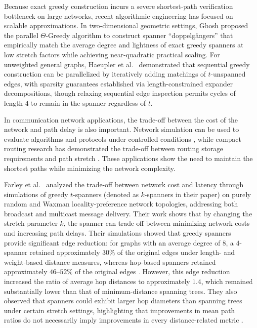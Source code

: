 \documentclass[conference]{IEEEtran}
\begin{document}
Because exact greedy construction incurs a severe shortest-path verification bottleneck on large networks, recent algorithmic engineering has focused on scalable approximations. In two-dimensional geometric settings, Ghosh \cite{ref22} proposed the parallel $\Theta$-Greedy algorithm to construct spanner ``doppelg\"{a}ngers'' that empirically match the average degree and lightness of exact greedy spanners at low stretch factors while achieving near-quadratic practical scaling. For unweighted general graphs, Haeupler et al.\ \cite{ref23} demonstrated that sequential greedy construction can be parallelized by iteratively adding matchings of $t$-unspanned edges, with sparsity guarantees established via length-constrained expander decompositions, though relaxing sequential edge inspection permits cycles of length $4$ to remain in the spanner regardless of $t$.

In communication network applications, the trade-off between the cost of the network and path delay is also important. Network simulation can be used to evaluate algorithms and protocols under controlled conditions \cite{ref24}, while compact routing research has demonstrated the trade-off between routing storage requirements and path stretch \cite{ref25}. These applications show the need to maintain the shortest paths while minimizing the network complexity.

Farley et al.\ \cite{ref16} analyzed the trade-off between network cost and latency through simulations of greedy $t$-spanners (denoted as $k$-spanners in their paper) on purely random and Waxman locality-preference network topologies, addressing both broadcast and multicast message delivery. Their work shows that by changing the stretch parameter $k$, the spanner can trade off between minimizing network costs and increasing path delays. Their simulations showed that greedy spanners provide significant edge reduction: for graphs with an average degree of $8$, a $4$-spanner retained approximately $30\%$ of the original edges under length- and weight-based distance measures, whereas hop-based spanners retained approximately $46\text{--}52\%$ of the original edges \cite{ref16}. However, this edge reduction increased the ratio of average hop distances to approximately $1.4$, which remained substantially lower than that of minimum-distance spanning trees. They also observed that spanners could exhibit larger hop diameters than spanning trees under certain stretch settings, highlighting that improvements in mean path ratios do not necessarily imply improvements in every distance-related metric \cite{ref16}.
\end{document}
